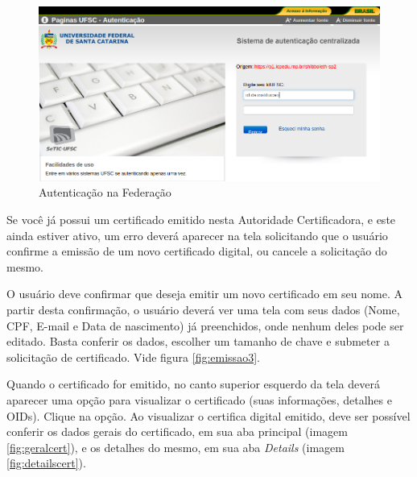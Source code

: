 \begin{figure}[ht]
     \centering
     \includegraphics[scale=0.3]{images/emitir2.png}
     \caption{Autenticação na Federação}
     \label{fig:ufxc2}
\end{figure}

Se você já possui um certificado emitido nesta Autoridade Certificadora, e este ainda estiver ativo, um erro deverá aparecer na tela solicitando que o usuário confirme a emissão de um novo certificado digital, ou cancele a solicitação do mesmo.

O usuário deve confirmar que deseja emitir um novo certificado em seu nome. A partir desta confirmação, o usuário deverá ver uma tela com seus dados (Nome, CPF, E-mail e Data de  nascimento) já preenchidos, onde nenhum deles pode ser editado. Basta conferir os dados, escolher um tamanho de chave e submeter a solicitação de certificado. Vide figura \ref{fig:emissao3}.

Quando o certificado for emitido, no canto superior esquerdo da tela deverá aparecer uma opção para visualizar o certificado (suas informações, detalhes e OIDs). Clique na opção. Ao visualizar o certifica digital emitido, deve ser possível conferir os dados gerais do certificado, em sua aba principal (imagem \ref{fig:geralcert}), e os detalhes do mesmo, em sua aba \textit{Details} (imagem \ref{fig:detailscert}).

